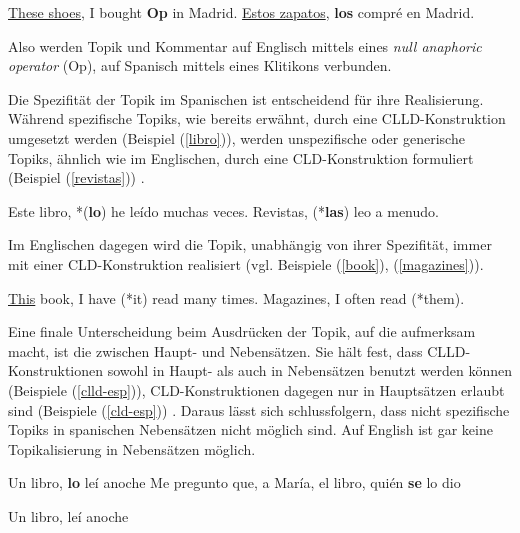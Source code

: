 \begin{exe}
    \ex \label{shoes} \uline{These shoes}, I bought \textbf{Op} in Madrid.
    \ex \label{zapatos} \uline{Estos zapatos}, \textbf{los} compré en Madrid.
\end{exe}

Also werden Topik und Kommentar auf Englisch mittels eines \textit{null anaphoric operator} (Op),
auf Spanisch mittels eines Klitikons verbunden.

Die Spezifität der Topik im Spanischen ist entscheidend für ihre Realisierung.
Während spezifische Topiks, wie bereits erwähnt, durch eine CLLD-Konstruktion umgesetzt werden (Beispiel (\ref{libro})),
werden unspezifische oder generische Topiks, ähnlich wie im Englischen, durch eine CLD-Konstruktion formuliert (Beispiel (\ref{revistas})) \cite{Valenzuela05}.

\begin{exe}
    \ex \label{libro} Este libro, *(\textbf{lo}) he leído muchas veces.
    \ex \label{revistas} Revistas, (*\textbf{las}) leo a menudo.
\end{exe}

Im Englischen dagegen wird die Topik, unabhängig von ihrer Spezifität, immer mit einer CLD-Konstruktion realisiert (vgl. Beispiele (\ref{book}), (\ref{magazines})).

\begin{exe}
    \ex \label{book} \uline{This} book, I have (*it) read many times.
    \ex \label{magazines} Magazines, I often read (*them).
\end{exe}

Eine finale Unterscheidung beim Ausdrücken der Topik, auf die \cite{Valenzuela05} aufmerksam macht, ist die zwischen Haupt- und Nebensätzen.
Sie hält fest, dass CLLD-Konstruktionen sowohl in Haupt- als auch in Nebensätzen benutzt werden können (Beispiele (\ref{clld-esp})),
CLD-Konstruktionen dagegen nur in Hauptsätzen erlaubt sind (Beispiele (\ref{cld-esp})) \cite{Valenzuela05}.
Daraus lässt sich schlussfolgern, dass nicht spezifische Topiks in spanischen Nebensätzen nicht möglich sind.
Auf English ist gar keine Topikalisierung in Nebensätzen möglich.

\begin{exe}
    \ex \label{clld-esp} \begin{xlist}
        \ex Un libro, \textbf{lo} leí anoche
        \ex Me pregunto que, a María, el libro, quién \textbf{se} lo dio
        \end{xlist}
    \ex \label{cld-esp} \begin{xlist}
        \ex Un libro, leí anoche
        \end{xlist}
\end{exe}

